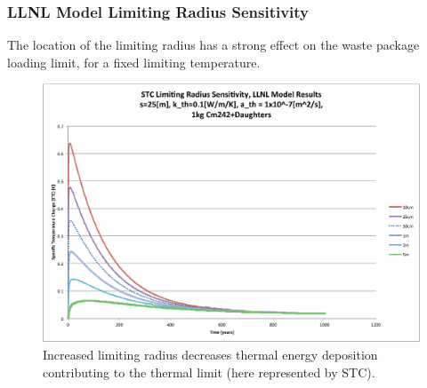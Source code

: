 \begin{frame}[ctb!]
\frametitle{LLNL Model Limiting Radius Sensitivity}

The location of the limiting radius has a strong effect on the 
waste package loading limit, for a fixed limiting temperature. 


\begin{figure}[htbp!]
\begin{center}
\includegraphics[height=0.7\textheight]{./thermal_demonstration/spacing/Cm242r_lim_sens.eps}
\end{center}
\caption[$K_{th}$ Sensitivity to $r_{lim}$]{Increased limiting radius 
decreases thermal energy deposition contributing to the thermal limit
(here represented by STC).}
\label{fig:Cm242r_lim_sens}
\end{figure}

\end{frame}

